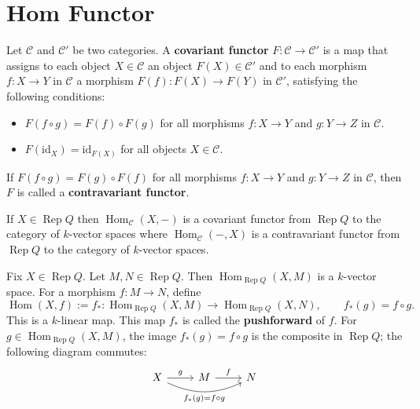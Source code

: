 \documentclass[11pt, a4paper]{report}
\begin{document}
\section{Hom Functor}

\begin{definition}
    Let $\mathcal{C}$ and $\mathcal{C}'$ be two categories. A \textbf{covariant functor} $F: \mathcal{C} \to \mathcal{C}'$ is a map that assigns to each object $X \in \mathcal{C}$ an object $F(X) \in \mathcal{C}'$ and to each morphism $f: X \to Y$ in $\mathcal{C}$ a morphism $F(f): F(X) \to F(Y)$ in $\mathcal{C}'$, satisfying the following conditions:
    \begin{itemize}
        \item $F(f \circ g) = F(f) \circ F(g)$ for all morphisms $f: X \to Y$ and $g: Y \to Z$ in $\mathcal{C}$.
        \item $F(\mathrm{id}_X) = \mathrm{id}_{F(X)}$ for all objects $X \in \mathcal{C}$.
    \end{itemize}
    If $F(f \circ g) =F(g) \circ F(f)$ for all morphisms $f: X \to Y$ and $g: Y \to Z$ in $\mathcal{C}$, then $F$ is called a \textbf{contravariant functor}.
\end{definition}

If $X \in \operatorname{Rep}Q$ then $\operatorname{Hom}_{\mathcal{C}}(X,-)$ is a covariant functor from $\operatorname{Rep}Q$ to the category of $k$-vector spaces where $\operatorname{Hom}_{\mathcal{C}}(-,X)$ is a contravariant functor from $\operatorname{Rep}Q$ to the category of $k$-vector spaces.

\begin{example}
    Fix $X \in \operatorname{Rep}Q$. Let $M, N \in \operatorname{Rep}Q$. Then $\operatorname{Hom}_{\operatorname{Rep}Q}(X,M)$ is a $k$-vector space. For a morphism $f:M\to N$, define
    \[
        \operatorname{Hom}(X,f):=f_*:\operatorname{Hom}_{\operatorname{Rep}Q}(X,M)\to \operatorname{Hom}_{\operatorname{Rep}Q}(X,N),
        \qquad
        f_*(g)=f\circ g.
    \]
    This is a $k$-linear map. This map $f_*$ is called the \textbf{pushforward} of $f$. For $g \in \operatorname{Hom}_{\operatorname{Rep}Q}(X,M)$, the image $f_*(g) = f \circ g$ is the composite in $\operatorname{Rep}Q$; the following diagram commutes:
    \[
        \begin{tikzcd}
            X \arrow[r, "g"] \arrow[rr, "f_*(g)=f \circ g"', bend right=25] & M \arrow[r, "f"] & N
        \end{tikzcd}
    \]
\end{example}
\end{document}
